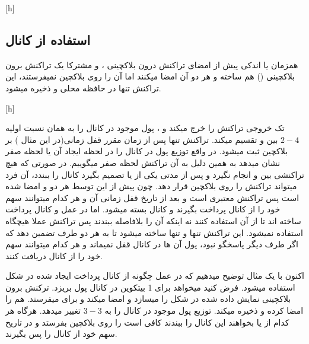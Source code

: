 [h]
\subsection{استفاده از کانال}
همزمان یا اندکی پیش از امضای تراکنش درون بلاکچینی ،   و   مشترکا یک تراکنش برون بلاکچینی () هم ساخته و هر دو آن امضا میکنند اما آن را روی بلاکچین نمیفرستند، این تراکنش تنها در حافظه محلی   و   ذخیره میشود. 

[h]


 تک خروجی تراکنش  را خرج میکند و ، پول موجود در کانال را به همان نسبت اولیه $2-4$ بین   و   تقسیم میکند.
تراکنش  تنها پس از زمان مقرر قفل زمانی(در این مثال ) بر بلاکچین ثبت میشود.
 در واقع توزیع پول در کانال را در لحظه ایجاد آن یا لحظه صفر نشان میدهد به همین دلیل به آن تراکنش لحظه صفر میگوییم. در صورتی که هیچ تراکنشی بین   و    انجام نگیرد و پس از مدتی یکی از   یا   تصمیم بگیرد کانال را ببندد، آن فرد میتواند تراکنش  را روی بلاکچین قرار دهد. چون   پیش از این توسط هر دو   و   امضا شده است پس تراکنش معتبری است و بعد از تاریخ  قفل زمانی آن   و    هر کدام میتوانند سهم خود را از کانال پرداخت بگیرند و کانال بسته میشود. اما در عمل   و    کانال پرداخت ساخته اند تا از آن استفاده کنند نه اینکه آن را بلافاصله ببندند پس تراکنش  عملا هیچگاه استفاده نمیشود. این تراکنش تنها و تنها ساخته میشود تا به هر دو طرف تضمین دهد که اگر طرف دیگر پاسخگو نبود، پول آن ها در کانال قفل نمیماند و هر کدام میتوانند سهم خود را از کانال دریافت کنند.

اکنون با یک مثال توضیح میدهیم که در عمل چگونه از کانال پرداخت ایجاد شده در شکل  استفاده میشود. فرض کنید   میخواهد برای  1 بیتکوین در کانال پول بریزد.  ترکنش برون بلاکچینی  نمایش داده شده در شکل  را میسازد و امضا میکند و برای  میفرستد.  هم  را امضا کرده و ذخیره میکند.  توزیع پول موجود در کانال را به $3-3$ تغییر میدهد. هرگاه هر کدام از    یا   بخواهند این کانال را ببندند کافی است  را روی بلاکچین بفرستد و در تاریخ  سهم خود از کانال را پس بگیرند. 


